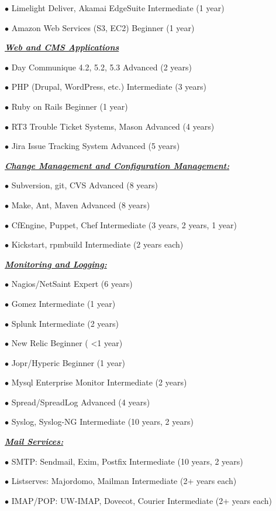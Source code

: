 \documentclass{article}
\newcommand{\skillset}[1]{{ \underline{\textbf{\emph{#1}}}\\  \nopagebreak }}
\newcommand{\skill}[2]{{$\bullet$ #1 \hfill #2 }}
\begin{document}
\skill{Limelight Deliver, Akamai EdgeSuite}{Intermediate (1 year)}

\skill{Amazon Web Services (S3, EC2)}{Beginner (1 year)}



\skillset{Web and CMS Applications}

\skill{Day Communique 4.2, 5.2, 5.3}{Advanced (2 years)}

\skill{PHP (Drupal, WordPress, etc.)}{Intermediate (3 years)}

\skill{Ruby on Rails}{Beginner (1 year)}

\skill{RT3 Trouble Ticket Systems, Mason}{Advanced (4 years)}

\skill{Jira Issue Tracking System}{Advanced (5 years)}



\skillset{Change Management and Configuration Management: }

\skill{Subversion, git, CVS}{Advanced (8 years)}

\skill{Make, Ant, Maven}{Advanced (8 years)}

\skill{CfEngine, Puppet, Chef}{Intermediate (3 years, 2 years, 1 year)}

\skill{Kickstart, rpmbuild}{Intermediate (2 years each)}



\skillset{Monitoring and Logging: }

\skill{Nagios/NetSaint}{Expert (6 years)}

\skill{Gomez}{Intermediate (1 year)}

\skill{Splunk}{Intermediate (2 years)}

\skill{New Relic}{Beginner ( \textless 1 year)}

\skill{Jopr/Hyperic}{Beginner (1 year)}

\skill{Mysql Enterprise Monitor}{Intermediate (2 years)}

\skill{Spread/SpreadLog}{Advanced (4 years)}

\skill{Syslog, Syslog-NG}{Intermediate (10 years, 2 years)}




\skillset{Mail Services:}

\skill{SMTP: Sendmail, Exim, Postfix}{Intermediate (10 years, 2 years)}

\skill{Listserves: Majordomo, Mailman}{Intermediate (2+ years each)}

\skill{IMAP/POP: UW-IMAP, Dovecot, Courier}{Intermediate (2+ years each)}
\end{document}
